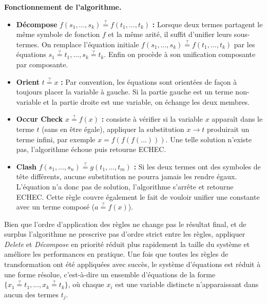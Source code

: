 \documentclass[11pt]{article}
\newenvironment{paraph}[1]{%
  \medskip
  \noindent\textbf{#1.}\quad

  \vspace{0.2cm}
}{%
  \medskip
}
\begin{document}
\begin{paraph}{Fonctionnement de l'algorithme}
\begin{itemize}
    \vspace{0.2cm}
    \item \noindent \textbf{Décompose} $f(s_1, \dots, s_k) \overset{?}{=} f(t_1, \dots, t_k)$ \textbf{:} Lorsque deux termes partagent le même symbole de fonction $f$ et la même arité, il suffit d'unifier leurs sous-termes. On remplace l'équation initiale $f(s_1, \dots, s_k) \overset{?}{=} f(t_1, \dots, t_k)$ par les équations $s_1 \overset{?}{=} t_1, \dots, s_k \overset{?}{=} t_k$. Enfin on procède à son unification composante par composante.

    \vspace{0.2cm}
    \item \noindent \textbf{Orient} $t \overset{?}{=} x$ \textbf{:} Par convention, les équations sont orientées de façon à toujours placer la variable à gauche. Si la partie gauche est un terme non-variable et la partie droite est une variable, on échange les deux membres.

    \vspace{0.2cm}
    \item \noindent \textbf{Occur Check} $x \overset{?}{=} f(x)$ \textbf{:} consiste à vérifier si la variable $x$ apparaît dans le terme $t$ (sans en être égale), appliquer la substitution $x \to t$ produirait un terme infini, par exemple $x = f(f(f(\dots)))$. Une telle solution n'existe pas, l'algorithme échoue puis retourne ECHEC.

    \vspace{0.2cm}
    \item \noindent \textbf{Clash} $f(s_1, \dots, s_n) \overset{?}{=} g(t_1, \dots, t_m)$ \textbf{:} Si les deux termes ont des symboles de tête différents, aucune substitution ne pourra jamais les rendre égaux. L'équation n'a donc pas de solution, l'algorithme s'arrête et retourne ECHEC. Cette règle couvre également le fait de vouloir unifier une constante avec un terme composé ($a \overset{?}{=} f(x)$).
    \end{itemize}

    \vspace{0.2cm}

    Bien que l'ordre d'application des règles ne change pas le résultat final, et de surplus l'algorithme
    ne prescrive pas d'ordre strict entre les règles, 
    appliquer \textit{Delete} et \textit{Décompose} en priorité 
    réduit plus rapidement la taille du système et améliore 
    les performances en pratique.
    Une fois que toutes les règles de transformation ont été appliquées 
    avec succès, le système d'équations est réduit à une forme 
    résolue, c'est-à-dire un ensemble d'équations de la forme 
    $\{x_1 \overset{?}{=} t_1, \dots, x_k \overset{?}{=} t_k\}$, 
    où chaque $x_i$ est une variable distincte n'apparaissant dans 
    aucun des termes $t_j$.


\end{paraph}
\end{document}
